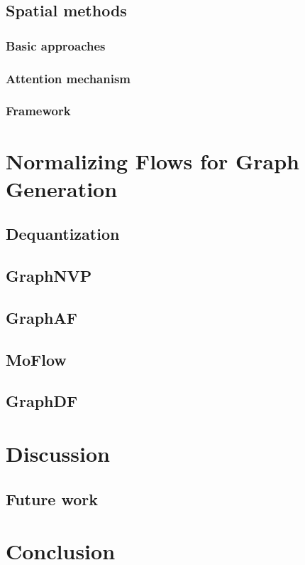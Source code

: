 \section{Spatial methods}
\subsection{Basic approaches}
\subsection{Attention mechanism}
\subsection{Framework}

\chapter{Normalizing Flows for Graph Generation}
\label{c:gnf}
\section{Dequantization}


\section{GraphNVP}
\section{GraphAF}
\section{MoFlow}
\section{GraphDF}

\chapter{Discussion}
\label{c:dis}
\section{Future work}

\chapter{Conclusion}
\label{c:conclude}


\appendix





